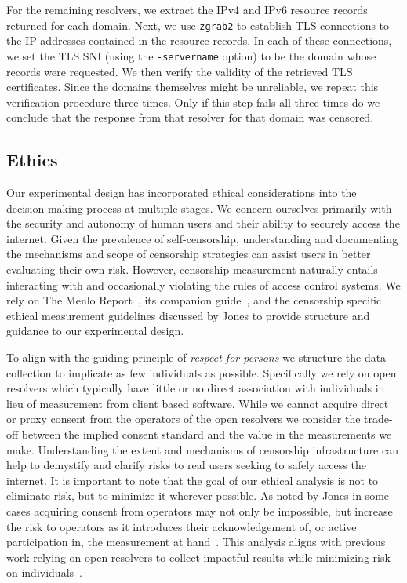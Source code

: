 For the remaining resolvers, we extract the IPv4 and IPv6 resource records
returned for each domain. Next, we use \texttt{zgrab2} to establish TLS
connections to the IP addresses contained in the resource records. In each of
these connections, we set the TLS SNI (using the {\tt -servername} option) to
be the domain whose records were requested. We then verify the validity of the
retrieved TLS certificates.
%
Since the domains themselves might be unreliable, we repeat this verification
procedure three times. Only if this step fails all three times do we conclude
that the response from that resolver for that domain was censored. 

\subsection{Ethics}\label{sec:methodology:ethics}
Our experimental design has incorporated ethical considerations into the
decision-making process at multiple stages. We concern ourselves primarily with
the security and autonomy of human users and their ability to securely access
the internet. Given the prevalence of self-censorship, understanding and
documenting the mechanisms and scope of censorship strategies can assist users
in better evaluating their own risk. However, censorship measurement naturally
entails interacting with and occasionally violating the rules of access control
systems. We rely on The Menlo Report~\cite{menlo}, its companion
guide~\cite{menlo-companion}, and the censorship specific ethical measurement
guidelines discussed by Jones \etal \cite{jones2015ethical} to provide
structure and guidance to our experimental design.

To align with the guiding principle of \textit{respect for persons} we
structure the data collection to implicate as few individuals as possible.
Specifically we rely on open resolvers which typically have little or no direct
association with individuals in lieu of measurement from client based
software. While we cannot acquire direct or proxy consent from the operators of
the open resolvers we consider the trade-off between the implied consent
standard and the value in the measurements we make. Understanding the extent
and mechanisms of censorship infrastructure can help to demystify and clarify
risks to real users seeking to safely access the internet. It is important to
note that the goal of our ethical analysis is not to eliminate risk, but to
minimize it wherever possible. As noted by Jones \etal in some cases acquiring
consent from operators may not only be impossible, but increase the risk to
operators as it introduces their acknowledgement of, or active participation
in, the measurement at hand~\cite{jones2015ethical}. This analysis aligns with
previous work relying on open resolvers to collect impactful results while
minimizing risk on
individuals~\cite{pearce2017global,scott2016satellite,sundara2020censored}.

